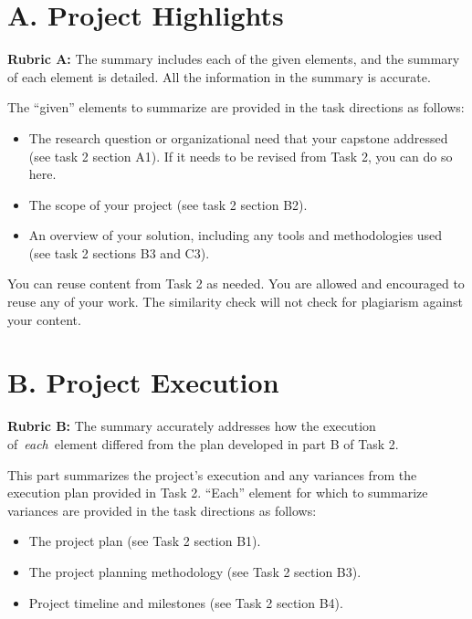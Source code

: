 \hypertarget{a.-project-highlights}{%
\section{A. Project Highlights}\label{a.-project-highlights}}

\textbf{Rubric A:} The summary includes each of the given elements, and
the summary of each element is detailed. All the information in the
summary is accurate.

The ``given'' elements to summarize are provided in the task directions
as follows:

\begin{itemize}
\item
  The research question or organizational need that your capstone
  addressed (see task 2 section A1). If it needs to be revised from Task
  2, you can do so here.
\item
  The scope of your project (see task 2 section B2).
\item
  An overview of your solution, including any tools and methodologies
  used (see task 2 sections B3 and C3).
\end{itemize}

You can reuse content from Task 2 as needed. You are allowed and
encouraged to reuse any of your work. The similarity check will not
check for plagiarism against your content.

\hypertarget{b.-project-execution}{%
\section{B. Project Execution}\label{b.-project-execution}}

\textbf{Rubric B:} The summary accurately addresses how the execution
of~\emph{each}~element differed from the plan developed in part B of
Task 2.

This part summarizes the project's execution and any variances from the
execution plan provided in Task 2. ``Each'' element for which to
summarize variances are provided in the task directions as follows:

\begin{itemize}
\item
  The project plan (see Task 2 section B1).
\item
  The project planning methodology (see Task 2 section B3).
\item
  Project timeline and milestones (see Task 2 section B4).
\end{itemize}

